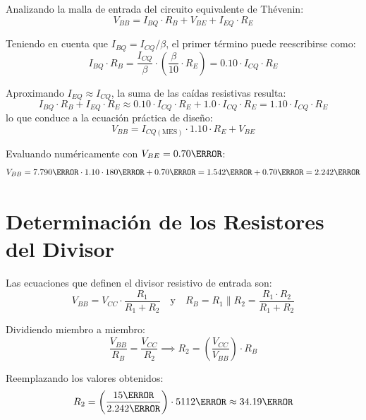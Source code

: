Analizando la malla de entrada del circuito equivalente de Thévenin:
\begin{equation}
  V_{BB} = I_{BQ} \cdot R_B + V_{BE} + I_{EQ} \cdot R_E
  \label{eq:malla_entrada}
\end{equation}

Teniendo en cuenta que $I_{BQ} = I_{CQ}/\beta$, el primer término puede reescribirse como:
\begin{equation}
  I_{BQ} \cdot R_B = \frac{I_{CQ}}{\beta} \cdot \left(\frac{\beta}{10} \cdot R_E\right) = 0.10 \cdot I_{CQ} \cdot R_E
\end{equation}

Aproximando $I_{EQ} \approx I_{CQ}$, la suma de las caídas resistivas resulta:
\begin{equation}
  I_{BQ} \cdot R_B + I_{EQ} \cdot R_E \approx 0.10 \cdot I_{CQ} \cdot R_E + 1.0 \cdot I_{CQ} \cdot R_E = 1.10 \cdot I_{CQ} \cdot R_E
\end{equation}
lo que conduce a la ecuación práctica de diseño:
\begin{equation}
  V_{BB} = I_{CQ(\text{MES})} \cdot 1.10 \cdot R_E + V_{BE}
  \label{eq:Vbb_formula}
\end{equation}

Evaluando numéricamente con $V_{BE} = 0.70\V$:
\begin{equation}
  V_{BB} = 7.790\mA \cdot 1.10 \cdot 180\ohm + 0.70\V = 1.542\V + 0.70\V = 2.242\V
  \label{eq:Vbb_calculada}
\end{equation}

\section{Determinación de los Resistores del Divisor}

Las ecuaciones que definen el divisor resistivo de entrada son:
\begin{equation}
  V_{BB} = V_{CC} \cdot \frac{R_1}{R_1 + R_2} \quad \text{y} \quad R_B = R_1 \parallel R_2 = \frac{R_1 \cdot R_2}{R_1 + R_2}
\end{equation}

Dividiendo miembro a miembro:
\begin{equation}
  \frac{V_{BB}}{R_B} = \frac{V_{CC}}{R_2} \implies R_2 = \left(\frac{V_{CC}}{V_{BB}}\right) \cdot R_B
  \label{eq:R2_formula}
\end{equation}

Reemplazando los valores obtenidos:
\begin{equation}
  R_2 = \left(\frac{15\V}{2.242\V}\right) \cdot 5112\ohm \approx 34.19\kohm
  \label{eq:R2_teorica}
\end{equation}

